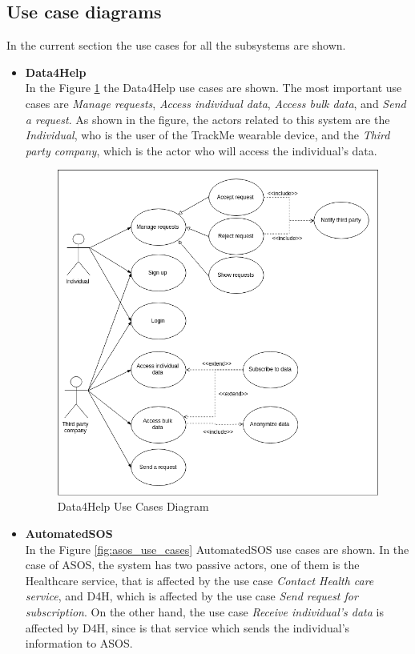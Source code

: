 \documentclass[12pt]{report}
\begin{document}
\subsection{Use case diagrams}
In the current section the use cases for all the subsystems are shown.

\begin{itemize}
\item{\textbf{Data4Help}} \\
In the Figure \ref{fig:d4h_use_cases} the Data4Help use cases are shown. The most important use cases are \textit{Manage requests}, \textit{Access individual data}, \textit{Access bulk data}, and \textit{Send a request}. As shown in the figure, the actors related to this system are the \textit{Individual}, who is the user of the TrackMe wearable device, and the \textit{Third party company}, which is the actor who will access the individual's data.

\begin{figure}[H]
\centering
	\includegraphics[scale=0.5]{Diagrams/d4h_use_cases.png}
\caption[Data4Help Use Cases Diagram]{Data4Help Use Cases Diagram}
\label{fig:d4h_use_cases}
\end{figure}

\item{\textbf{AutomatedSOS}}\\
In the Figure \ref{fig:asos_use_cases} AutomatedSOS use cases are shown. In the case of ASOS, the system has two passive actors, one of them is the Healthcare service, that is affected by the use case \textit{Contact Health care service}, and D4H, which is affected by the use case \textit{Send request for subscription}. On the other hand, the use case \textit{Receive individual's data} is affected by D4H, since is that service which sends the individual's information to ASOS.


\end{itemize}
\end{document}
